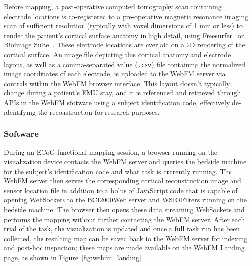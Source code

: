 \documentclass[utf8]{frontiersSCNS}
\begin{document}
Before mapping, a post-operative computed tomography scan containing electrode locations is co-registered to a pre-operative magnetic resonance imaging scan of sufficient resolution (typically with voxel dimensions of 1 mm or less) to render the patient's cortical surface anatomy in high detail, using Freesurfer~\citep{fischl_freesurfer_2012} or Bioimage Suite~\citep{papademetris_bioimage_2006}.
These electrode locations are overlaid on a 2D rendering of the cortical surface.
An image file depicting this cortical anatomy and electrode layout, as well as a comma-separated value (\texttt{.csv}) file containing the normalized image coordinates of each electrode, is uploaded to the WebFM server via controls within the WebFM browser interface.
This layout doesn't typically change during a patient's EMU stay, and it is referenced and retrieved through APIs in the WebFM sfotware using a subject identification code, effectively de-identifying the reconstruction for research purposes.

\subsubsection{Software}

During an ECoG functional mapping session, a browser running on the visualization device contacts the WebFM server and queries the bedside machine for the subject's identification code and what task is currently running.
The WebFM server then serves the corresponding cortical reconstruction image and sensor location file in addition to a bolus of JavaScript code that is capable of opening WebSockets to the BCI2000Web server and WSIOFilters running on the bedside machine.
The browser then opens these data streaming WebSockets and performs the mapping without further contacting the WebFM server.
After each trial of the task, the visualization is updated and once a full task run has been collected, the resulting map can be saved back to the WebFM server for indexing and post-hoc inspection; these maps are made available on the WebFM Landing page, as shown in Figure~\ref{fig:webfm_landing}.
\end{document}
